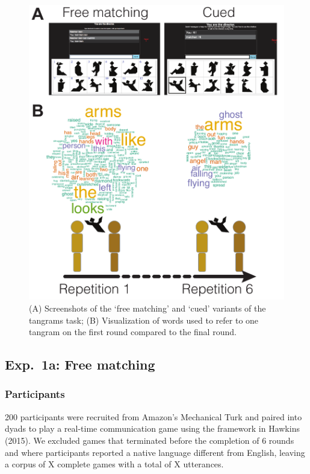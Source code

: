 \documentclass[alpha-refs]{wiley-article}
\begin{document}
\begin{figure}
\includegraphics[scale=.65]{designAndExample.pdf}
\caption{(A) Screenshots of the `free matching' and `cued' variants of the tangrams task; (B) Visualization of words used to refer to one tangram on the first round compared to the final round. }
\label{fig:design}
\end{figure}

\subsection{Exp.~1a: Free matching}

\subsubsection{Participants}\label{participants}

200 participants were recruited from Amazon's Mechanical Turk and paired
into dyads to play a real-time communication game using the framework in
Hawkins (2015). We excluded games that terminated before the completion
of 6 rounds and where participants reported a native language different
from English, leaving a corpus of X complete games with a total of
X utterances.
\end{document}

